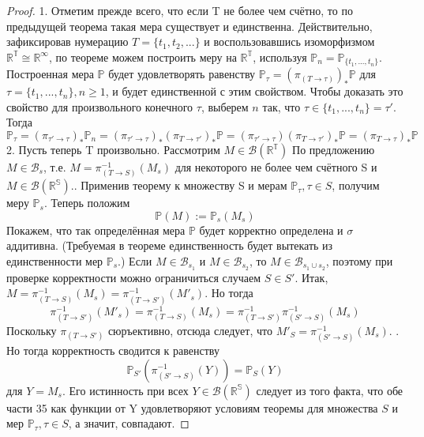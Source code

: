 \begin{proof}
1. Отметим прежде всего, что если T не более чем счётно, то по предыдущей
теорема такая мера существует и единственна. Действительно, зафиксировав нумерацию $T = \{t_1, t_2, ...\}$ и воспользовавшись изоморфизмом $\mathbb{R^{T}} \cong \mathbb{R^{{\infty}}}$, по теореме  можем построить меру на $\mathbb{R^{T}}$, используя $\mathbb{P}_{n} = \mathbb{P}_{\{t_1,...,t_n\}}$. Построенная мера $\mathbb{P}$ будет удовлетворять равенству $ \mathbb{P_{\tau}} = (\pi_{(T\rightarrow \tau)})_{*}\mathbb{P}$ для
$\tau = \{t_1, ..., t_n\}, n \geq 1 $, и будет единственной с этим свойством. Чтобы доказать это свойство для произвольного конечного $\tau$, выберем $n$ так, что $\tau \in \{t_1, ..., t_n\} = \tau' $. Тогда
\begin{equation}
    \mathbb{P_{\tau}} = (\pi_{\tau' \rightarrow \tau})_{*} \mathbb{P}_{n} =  (\pi_{\tau' \rightarrow \tau})_{*}(\pi_{T \rightarrow \tau'})_{*}  \mathbb{P} = (\pi_{\tau' \rightarrow \tau})(\pi_{T \rightarrow \tau'})_{*}  \mathbb{P} = (\pi_{T \rightarrow \tau})_{*}  \mathbb{P}
\end{equation}
2. Пусть теперь T произвольно. Рассмотрим $M  \in  \mathscr{B}(\mathbb{R^{T}})$ По предложению $M \in \mathscr{B}_s$, т.е. $M = \pi^{-1}_{(T \rightarrow S)}(M_s)$ для некоторого не более чем счётного S и $M  \in  \mathscr{B}(\mathbb{R^{S}})$.. Применив теорему к множеству S и мерам $\mathbb{P}_{\tau}, \tau \in S$, получим меру $ \mathbb{P}_{s}$. Теперь положим
\begin{equation}
     \mathbb{P}(M) :=   \mathbb{P}_{s}(M_{s}) 
\end{equation}
Покажем, что так определённая мера $ \mathbb{P}$ будет корректно определена и $\sigma$ аддитивна. (Требуемая в теореме единственность будет вытекать из единственности мер $ \mathbb{P}_{s}$.)
Если $M \in \mathscr{B}_{s_1} $ и $M \in \mathscr{B}_{s_2} $, то $M \in \mathscr{B}_{s_1 \cup s_2}$, поэтому при проверке корректности можно
ограничиться случаем $S \in S'$. Итак, $M = \pi^{-1}_{(T \rightarrow S)}(M_s) = \pi^{-1}_{(T \rightarrow S')}(M'_s).$ Но тогда
\begin{equation}
   \pi^{-1}_{(T \rightarrow S')}(M'_s) =  \pi^{-1}_{(T \rightarrow S)}(M_s) =  \pi^{-1}_{(T \rightarrow S')} \pi^{-1}_{(S' \rightarrow S)} (M_s) 
\end{equation}
Поскольку $\pi_{(T \rightarrow S')}$ сюръективно, отсюда следует, что $M'_{S} = \pi^{-1}_{(S' \rightarrow S)} (M_s) $. . Но тогда корректность
сводится к равенству 
\begin{equation}
    \mathbb{P}_{S'}(\pi^{-1}_{(S' \rightarrow S)} (Y)) =  \mathbb{P}_{S}(Y)
\end{equation}
для $Y = M_s$. Его истинность при всех $Y \in \mathscr{B}(\mathbb{R^{S}}) $
следует из того факта, что обе части 35 как функции от Y удовлетворяют условиям теоремы для множества $S$ и мер $ \mathbb{P}_{\tau}, \tau \in S$, а значит, совпадают.
\end{proof}
 


